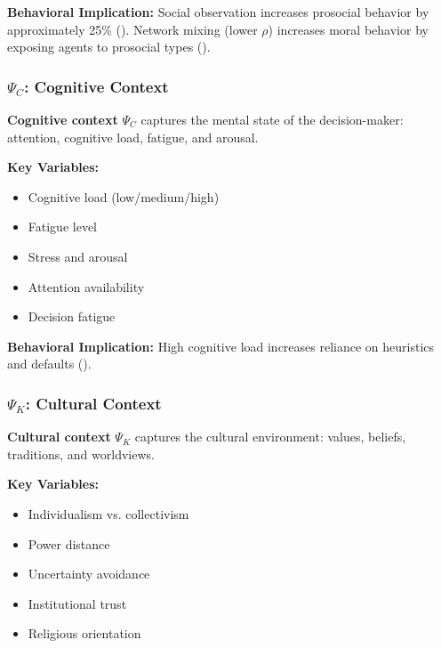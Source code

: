 \textbf{Behavioral Implication:}
Social observation increases prosocial behavior by approximately 25\%
(\citet{ariely2009doing}). Network mixing (lower $\rho$) increases moral behavior
by exposing agents to prosocial types (\citet{benabou_2018_narratives}).

\subsubsection{$\Psi_C$: Cognitive Context}

\begin{definition}
\textbf{Cognitive context} $\Psi_C$ captures the mental state of the decision-maker:
attention, cognitive load, fatigue, and arousal.
\end{definition}

\textbf{Key Variables:}
\begin{itemize}[nosep]
\item Cognitive load (low/medium/high)
\item Fatigue level
\item Stress and arousal
\item Attention availability
\item Decision fatigue
\end{itemize}

\textbf{Behavioral Implication:}
High cognitive load increases reliance on heuristics and defaults
(\citet{kahneman2011thinking}).

\subsubsection{$\Psi_K$: Cultural Context}

\begin{definition}
\textbf{Cultural context} $\Psi_K$ captures the cultural environment:
values, beliefs, traditions, and worldviews.
\end{definition}

\textbf{Key Variables:}
\begin{itemize}[nosep]
\item Individualism vs. collectivism
\item Power distance
\item Uncertainty avoidance
\item Institutional trust
\item Religious orientation
\end{itemize}

